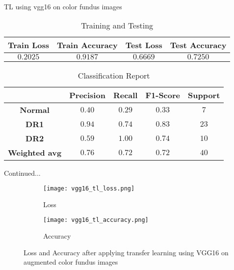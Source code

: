 \documentclass{beamer}
\begin{document}
\begin{frame}{TL using vgg16 on color fundus images}
\begin{table}
\caption{Training and Testing}
\begin{tabular}{c c c c}
\hline
\textbf{Train Loss} & \textbf{Train Accuracy} & \textbf{Test Loss} & \textbf{Test Accuracy}\\
\hline
$0.2025$ & $0.9187$ & $0.6669$ & $0.7250$\\
\hline
\end{tabular}
\end{table}

\begin{table}
\caption{Classification Report}
\begin{tabular}{c c c c c}
\hline
\textbf{} & \textbf{Precision} & \textbf{Recall} & \textbf{F1-Score} & \textbf{Support} \\
\hline
\textbf{Normal} & $0.40$ & $0.29$ & $0.33$ & $7$\\
\textbf{DR1} & $0.94$ & $ 0.74$ & $0.83$ & $23$\\
\textbf{DR2} & $0.59$ & $1.00$ & $0.74$ & $10$\\
\textbf{Weighted avg} & $0.76$ & $0.72$ & $0.72$ & $40$\\
\hline
\end{tabular}
\end{table}
\end{frame}

\begin{frame}{Continued...}
\begin{figure}[H]
\centering
\begin{subfigure}[h]{0.45\linewidth}
\texttt{[image: vgg16\_tl\_loss.png]}
\caption{Loss}
\label{fig:a}
\end{subfigure}
\quad
\begin{subfigure}[h]{0.45\linewidth}
\texttt{[image: vgg16\_tl\_accuracy.png]}
\caption{Accuracy}
\label{fig:b}
\end{subfigure}
\caption{Loss and Accuracy after applying transfer learning using VGG16 on augmented color fundus images}
\label{fig: Image4}
\end{figure}
\end{frame}
\end{document}
